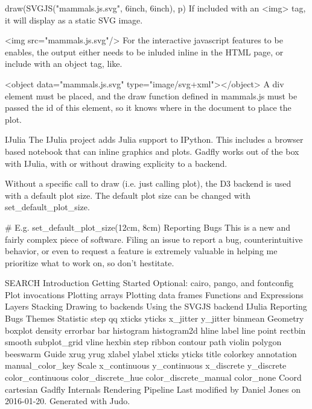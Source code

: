 draw(SVGJS("mammals.js.svg", 6inch, 6inch), p)
If included with an <img> tag, it will display as a static SVG image.

<img src="mammals.js.svg"/>
For the interactive javascript features to be enables, the output either needs to be inluded inline in the HTML page, or include with an object tag, like.

<object data="mammals.js.svg" type="image/svg+xml"></object>
A div element must be placed, and the draw function defined in mammals.js must be passed the id of this element, so it knows where in the document to place the plot.

IJulia
The IJulia project adds Julia support to IPython. This includes a browser based notebook that can inline graphics and plots. Gadfly works out of the box with IJulia, with or without drawing explicity to a backend.

Without a specific call to draw (i.e. just calling plot), the D3 backend is used with a default plot size. The default plot size can be changed with set_default_plot_size.

# E.g.
set_default_plot_size(12cm, 8cm)
Reporting Bugs
This is a new and fairly complex piece of software. Filing an issue to report a bug, counterintuitive behavior, or even to request a feature is extremely valuable in helping me prioritize what to work on, so don't hestitate.


SEARCH
Introduction
Getting Started
Optional: cairo, pango, and fontconfig
Plot invocations
Plotting arrays
Plotting data frames
Functions and Expressions
Layers
Stacking
Drawing to backends
Using the SVGJS backend
IJulia
Reporting Bugs
Themes
Statistic
step
qq
xticks
yticks
x_jitter
y_jitter
binmean
Geometry
boxplot
density
errorbar
bar
histogram
histogram2d
hline
label
line
point
rectbin
smooth
subplot_grid
vline
hexbin
step
ribbon
contour
path
violin
polygon
beeswarm
Guide
xrug
yrug
xlabel
ylabel
xticks
yticks
title
colorkey
annotation
manual_color_key
Scale
x_continuous
y_continuous
x_discrete
y_discrete
color_continuous
color_discrete_hue
color_discrete_manual
color_none
Coord
cartesian
Gadfly Internals
Rendering Pipeline
Last modified by Daniel Jones on 2016-01-20. Generated with Judo.